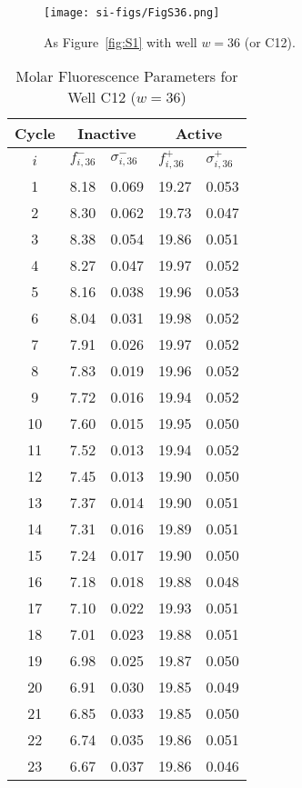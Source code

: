                 \begin{figure}
                    \centering
                    \texttt{[image: si-figs/FigS36.png]}
                    \caption{
                        As Figure~\ref{fig:S1} with well $w=36$ (or C12).
                    }
                \end{figure}
                \clearpage
    \begin{table}
        \caption{Molar Fluorescence Parameters for Well C12 ($w=36$)}
        \centering
        \begin{tabular}{c|ll|ll}
            Cycle & \multicolumn{2}{c|}{Inactive} & \multicolumn{2}{c}{Active} \\
            \hline
            $i$ & $f_{i,36}^{-}$ & $\sigma_{i,36}^{-}$ &  $f_{i,36}^{+}$ & $\sigma_{i,36}^{+}$ \\
            \hline
    1 & 8.18 & 0.069 & 19.27 & 0.053 \\
2 & 8.30 & 0.062 & 19.73 & 0.047 \\
3 & 8.38 & 0.054 & 19.86 & 0.051 \\
4 & 8.27 & 0.047 & 19.97 & 0.052 \\
5 & 8.16 & 0.038 & 19.96 & 0.053 \\
6 & 8.04 & 0.031 & 19.98 & 0.052 \\
7 & 7.91 & 0.026 & 19.97 & 0.052 \\
8 & 7.83 & 0.019 & 19.96 & 0.052 \\
9 & 7.72 & 0.016 & 19.94 & 0.052 \\
10 & 7.60 & 0.015 & 19.95 & 0.050 \\
11 & 7.52 & 0.013 & 19.94 & 0.052 \\
12 & 7.45 & 0.013 & 19.90 & 0.050 \\
13 & 7.37 & 0.014 & 19.90 & 0.051 \\
14 & 7.31 & 0.016 & 19.89 & 0.051 \\
15 & 7.24 & 0.017 & 19.90 & 0.050 \\
16 & 7.18 & 0.018 & 19.88 & 0.048 \\
17 & 7.10 & 0.022 & 19.93 & 0.051 \\
18 & 7.01 & 0.023 & 19.88 & 0.051 \\
19 & 6.98 & 0.025 & 19.87 & 0.050 \\
20 & 6.91 & 0.030 & 19.85 & 0.049 \\
21 & 6.85 & 0.033 & 19.85 & 0.050 \\
22 & 6.74 & 0.035 & 19.86 & 0.051 \\
23 & 6.67 & 0.037 & 19.86 & 0.046 \\

\end{tabular}
\end{table}
